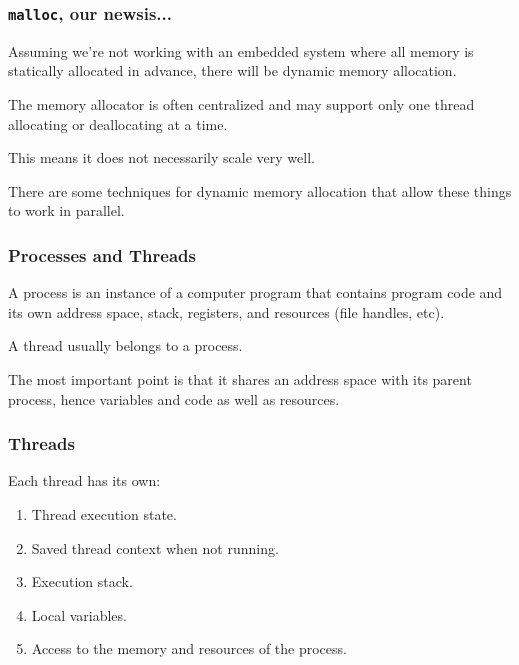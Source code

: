 \begin{frame}
\frametitle{\texttt{malloc}, our newsis...}

Assuming we're not working with an embedded system where all memory is statically allocated in advance, there will be dynamic memory allocation. 

The memory allocator is often centralized and may support only one thread allocating or deallocating at a time. 

This means it does not necessarily scale very well.

There are some techniques for dynamic memory allocation that allow these things to work in parallel.


\end{frame}



\begin{frame}
\frametitle{Processes and Threads}
A \alert{process} is an
instance of a computer program that contains program code and its own
address space, stack, registers, and resources (file handles, etc).  

A
\alert{thread} usually belongs to a process. 

The most important point
is that it shares an address space with its parent process, hence
variables and code as well as resources.


\end{frame}



\begin{frame}
\frametitle{Threads}

Each thread has its own:
\begin{enumerate}
	\item Thread execution state.
	\item Saved thread context when not running.
	\item Execution stack.
	\item Local variables.
	\item Access to the memory and resources of the process.
\end{enumerate}


\end{frame}



